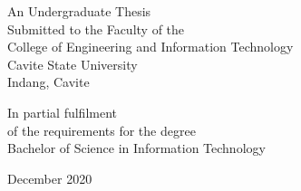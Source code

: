 
\begin{singlespace}
	\begin{titlepage}
		\begin{center}
			\textbf{\thesistitle{}}

			\vfill
			\center
			An Undergraduate Thesis\\
			Submitted to the Faculty of the\\
			College of Engineering and Information Technology\\
			Cavite State University\\
			Indang, Cavite

			\vfill
			\center
			In partial fulfilment\\
			of the requirements for the degree\\
			Bachelor of Science in Information Technology

			\vfill
			\thesisautors{}
			{December 2020}

		\end{center}
	\end{titlepage}
\end{singlespace}
